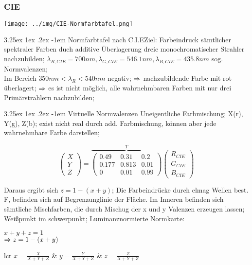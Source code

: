 \documentclass[german,color,6pt]{latex4ei/latex4ei_sheet}
\makeatletter
\renewcommand\paragraph{\@startsection{paragraph}{4}{\z@}%
                                    {3.25ex \@plus1ex \@minus.2ex}%
                                    {-1em}%
                                    {\normalfont\normalsize\bfseries}}
\makeatother
\begin{document}
\begin{sectionbox}
\subsubsection{CIE}
\parbox{3.5cm}{\texttt{[image: ../img/CIE-Normfarbtafel.png]}}
\parbox{3.3cm}{\paragraph{Normfarbtafel nach C.I.E}Ziel: Farbeindruck sämtlicher spektraler Farben duch additive Überlagerung dreie monochromatischer Strahler nachzubilden; $\lambda _{R, CIE} = 700 nm, \lambda _{G, CIE} = 546.1 nm, \lambda _{B, CIE} = 435.8 nm$ sog. Normvalenzen; \\
Im Bereich $350 nm < \lambda_R < 540 nm$ negativ; $\Rightarrow$ nachzubildende Farbe mit rot überlagert; $\Rightarrow$ es ist nicht möglich, alle wahrnehmbaren Farben mit nur drei Primärstrahlern nachzubilden; 
}
\paragraph{Virtuelle Normvalenzen} Uneigentliche Farbmischung; X(r), Y(g), Z(b); exist nicht real durch add. Farbmischung, können aber jede wahrnehmbare Farbe darstellen; 


\begin{equation*}
	\begin{pmatrix} 	X \\ Y \\ Z \end{pmatrix} = \overbrace{\begin{pmatrix}
	0.49 & 0.31 & 0.2 \\
	0.177 & 0.813 & 0.01 \\
	0 & 0.01 & 0.99
\end{pmatrix} }^T\begin{pmatrix}
	R_{CIE} \\ G_{CIE} \\ B_{CIE}
\end{pmatrix}
\end{equation*}

Daraus ergibt sich $z = 1 - (x+y)$; Die Farbeindrücke durch elmag Wellen best. F, befinden sich auf Begrenzunglinie der Fläche. Im Inneren befinden sich sämtliche Mischfarben, die durch Mischug der x und y Valenzen erzeugen lassen; Weißpunkt im schwerpunkt; Luminanznormierte Normkarte: 
\vspace{0.3em}

\begin{emphbox}
$x + y + z = 1$\\
$\Rightarrow z = 1 - (x+y)$
\end{emphbox}

\vspace{0.3em}

\begin{tablebox}{lcr}
	$x = \frac{X}{X + Y + Z}$ & $y = \frac{Y}{X + Y + Z}$ & $z = \frac{Z}{X + Y + Z}$\\
\end{tablebox}
\end{sectionbox}
\end{document}
